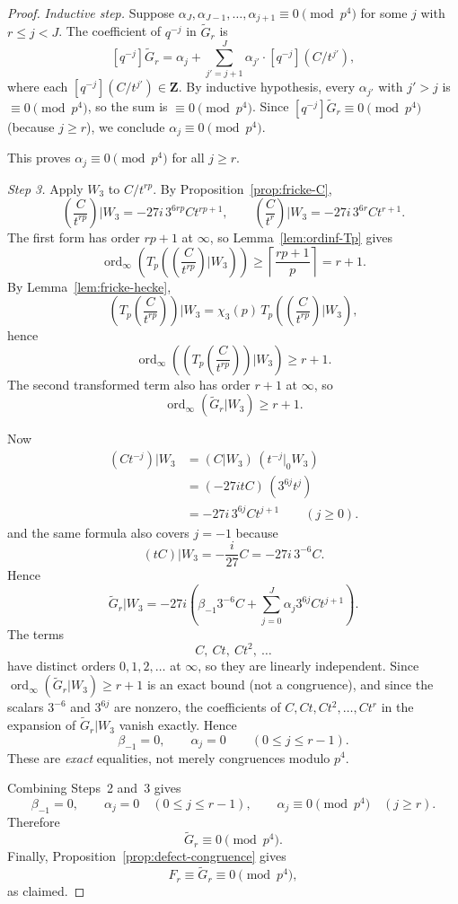 \documentclass[11pt]{amsart}
\theoremstyle{remark}
\DeclareMathOperator{\ord}{ord}
\newcommand{\Z}{\mathbf{Z}}
\begin{document}
\begin{proof}
\emph{Inductive step.} Suppose $\alpha_J,\alpha_{J-1},\ldots,\alpha_{j+1}\equiv0\pmod{p^4}$ for some
$j$ with $r\le j<J$. The coefficient of $q^{-j}$ in $\widetilde G_r$ is
\[
[q^{-j}]\widetilde G_r
=
\alpha_j+\sum_{j'=j+1}^{J}\alpha_{j'}\cdot[q^{-j}](C/t^{j'}),
\]
where each $[q^{-j}](C/t^{j'})\in\Z$. By inductive hypothesis, every $\alpha_{j'}$ with $j'>j$ is
$\equiv0\pmod{p^4}$, so the sum is $\equiv0\pmod{p^4}$. Since $[q^{-j}]\widetilde G_r\equiv0\pmod{p^4}$
(because $j\ge r$), we conclude $\alpha_j\equiv0\pmod{p^4}$.

This proves $\alpha_j\equiv0\pmod{p^4}$ for all $j\ge r$.

\emph{Step 3.} Apply $W_3$ to $C/t^{rp}$. By Proposition~\ref{prop:fricke-C},
\[
\left(\frac{C}{t^{rp}}\right)\Big|W_3
=
-27i\,3^{6rp}Ct^{rp+1},
\qquad
\left(\frac{C}{t^r}\right)\Big|W_3
=
-27i\,3^{6r}Ct^{r+1}.
\]
The first form has order $rp+1$ at $\infty$, so Lemma~\ref{lem:ordinf-Tp} gives
\[
\ord_\infty\!\left(
T_p\!\left(\left(\frac{C}{t^{rp}}\right)\Big|W_3\right)
\right)
\ge
\left\lceil\frac{rp+1}{p}\right\rceil
=
r+1.
\]
By Lemma~\ref{lem:fricke-hecke},
\[
\left(T_p\!\left(\frac{C}{t^{rp}}\right)\right)\Big|W_3
=
\chi_3(p)\,
T_p\!\left(\left(\frac{C}{t^{rp}}\right)\Big|W_3\right),
\]
hence
\[
\ord_\infty\!\left(
\left(T_p\!\left(\frac{C}{t^{rp}}\right)\right)\Big|W_3
\right)\ge r+1.
\]
The second transformed term also has order $r+1$ at $\infty$, so
\[
\ord_\infty(\widetilde G_r|W_3)\ge r+1.
\]

Now
\begin{align*}
(Ct^{-j})|W_3
&=
(C|W_3)\,(t^{-j}|_0W_3) \\
&=
(-27itC)\,(3^{6j}t^j) \\
&=
-27i\,3^{6j}Ct^{j+1}
\qquad (j\ge0).
\end{align*}
and the same formula also covers $j=-1$ because
\[
(tC)|W_3=-\frac{i}{27}C=-27i\,3^{-6}C.
\]
Hence
\[
\widetilde G_r|W_3
=
-27i\left(
\beta_{-1}3^{-6}C+\sum_{j=0}^{J}\alpha_j3^{6j}Ct^{j+1}
\right).
\]
The terms
\[
C,\ Ct,\ Ct^2,\ \dots
\]
have distinct orders $0,1,2,\dots$ at $\infty$, so they are linearly independent.
Since $\ord_\infty(\widetilde G_r|W_3)\ge r+1$ is an exact bound (not a congruence),
and since the scalars $3^{-6}$ and $3^{6j}$ are nonzero, the coefficients of
$C, Ct, Ct^2, \ldots, Ct^r$ in the expansion of $\widetilde G_r|W_3$ vanish exactly.
Hence
\[
\beta_{-1}=0,
\qquad
\alpha_j=0
\qquad (0\le j\le r-1).
\]
These are \emph{exact} equalities, not merely congruences modulo $p^4$.

Combining Steps~2 and~3 gives
\[
\beta_{-1}=0,
\qquad
\alpha_j=0
\quad (0\le j\le r-1),
\qquad
\alpha_j\equiv0\pmod{p^4}
\quad (j\ge r).
\]
Therefore
\[
\widetilde G_r\equiv0\pmod{p^4}.
\]
Finally, Proposition~\ref{prop:defect-congruence} gives
\[
F_r\equiv \widetilde G_r\equiv0\pmod{p^4},
\]
as claimed.
\end{proof}
\end{document}
